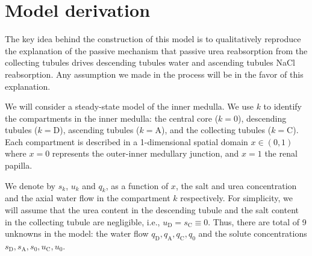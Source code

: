 \documentclass{article}
\numberwithin{equation}{section} %
\begin{document}
\section{Model derivation}

The key idea behind the construction of this model is to qualitatively reproduce the explanation of the passive mechanism that passive urea reabsorption from the collecting tubules drives descending tubules water and ascending tubules NaCl reabsorption.
Any assumption we made in the process will be in the favor of this explanation.

We will consider a steady-state model of the inner medulla.
We use $k$ to identify the compartments in the inner medulla: the central core ($k=0$), descending tubules ($k=\mathrm{D}$), ascending tubules ($k=\mathrm{A}$), and the collecting tubules ($k=\mathrm{C}$).
Each compartment is described in a 1-dimensional spatial domain $x\in (0,1)$ where $x=0$ represents the outer-inner medullary junction, and $x=1$ the renal papilla.

We denote by $s_k$, $u_k$ and $q_k$, as a function of $x$, the salt and urea concentration and the axial water flow in the compartment $k$ respectively.
For simplicity, we will assume that the urea content in the descending tubule and the salt content in the collecting tubule are negligible, i.e., $u_\mathrm{D}=s_\mathrm{C}\equiv 0$.
Thus, there are total of 9 unknowns in the model: the water flow $q_\mathrm{D},q_\mathrm{A},q_\mathrm{C},q_0$ and the solute concentrations $s_\mathrm{D},s_\mathrm{A},s_0,u_\mathrm{C},u_0$.
\end{document}
